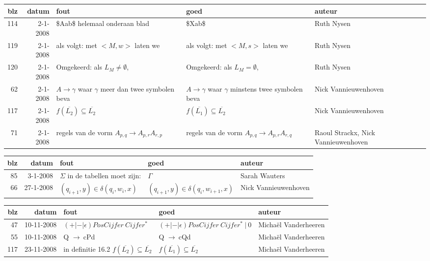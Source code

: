 \documentclass[11pt]{fund}
\newcommand{\rpijl}{$\rightarrow~$}
\begin{document}
\newpage
\begin{tabular}{|r|r|p{6cm}|p{6cm}|p{2cm}|}
\hline
blz & datum    & fout & goed  & auteur \\ \hline

114 &
2-1-2008 &
\$Aab\$ helemaal onderaan blad & 
\$Xab\$ &
Ruth Nysen  \\ \hline

119 &
2-1-2008 &
als volgt: met $<M,w>$ laten we & 
als volgt: met $<M,s>$ laten we & 
Ruth Nysen  \\ \hline

120 &
2-1-2008 &
Omgekeerd: als $L_M \neq \emptyset$, & 
Omgekeerd: als $L_M = \emptyset$, &
Ruth Nysen  \\ \hline

62 &
2-1-2008 &
$A \rightarrow \gamma$ waar $\gamma$ meer dan twee symbolen beva & 
$A \rightarrow \gamma$ waar $\gamma$ minstens twee symbolen beva &
Nick Vannieuwenhoven  \\ \hline

117 &
2-1-2008 &
$f(\overline{L_2}) \subseteq \overline{L_2}$ & 
$f(\overline{L_1}) \subseteq \overline{L_2}$ &
Nick Vannieuwenhoven  \\ \hline

71 &
2-1-2008 &
regels van de vorm $A_{p,q} \rightarrow A_{p,r}A_{r,p}$ & 
regels van de vorm $A_{p,q} \rightarrow A_{p,r}A_{r,q}$ &
Raoul Strackx, Nick Vannieuwenhoven  \\ \hline


\end{tabular}

\newpage
\begin{tabular}{|r|r|p{6cm}|p{6cm}|p{2cm}|}
\hline
blz & datum    & fout & goed  & auteur \\ \hline

85 &
3-1-2008 &
$\Sigma$ in de tabellen moet zijn: &
$\Gamma$ &
Sarah Wauters  \\ \hline

66 &
27-1-2008 &
$(q_{i+1},y) \in \delta(q_i,w_i,x)$&
$(q_{i+1},y) \in \delta(q_i,w_{i+1},x)$&
Nick Vannieuwenhoven \\ \hline

\end{tabular}

\newpage
\begin{tabular}{|r|r|p{6cm}|p{6cm}|p{2cm}|}
\hline
blz & datum    & fout & goed  & auteur \\ \hline

47 &
10-11-2008 &
$(+|-|\epsilon)PosCijfer~Cijfer^*$ &
$(+|-|\epsilon)PosCijfer~Cijfer^*~|~0$ &
Michaël Vanderheeren \\ \hline

55 &
10-11-2008 &
Q \rpijl cPd &
Q \rpijl cQd &
Michaël Vanderheeren \\ \hline

117 &
23-11-2008 &
in definitie 16.2 $f(\overline{L_2}) \subseteq \overline{L_2}$ &
$f(\overline{L_1}) \subseteq \overline{L_2}$ &
Michaël Vanderheeren \\ \hline

\end{tabular}
\end{document}
